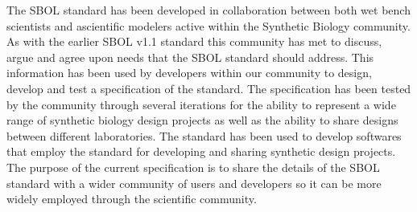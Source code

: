 The SBOL standard has been developed in collaboration between both wet bench scientists and ascientific modelers active within the Synthetic Biology community. As with the earlier SBOL v1.1 standard this community has met to discuss, argue and agree upon needs that the SBOL standard should address. This information has been used by developers within our community to design, develop and test a specification of the standard. The specification has been tested by the community through several iterations for the ability to represent a wide range of synthetic biology design projects as well as the ability to share designs between different laboratories. The standard has been used to develop softwares that employ the standard for developing and sharing synthetic design projects. The purpose of the current specification is to share the details of the SBOL standard with a wider community of users and developers so it can be more widely employed through the scientific community.
